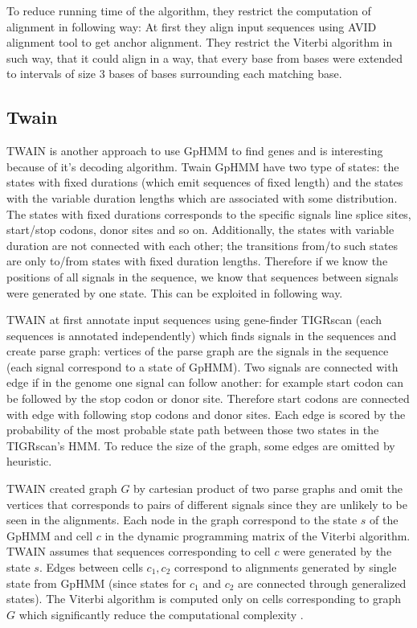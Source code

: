 To reduce running time of the algorithm, they restrict the computation of
alignment in following way: At first they  align input sequences using AVID
alignment tool\cite{Bray2003} to get anchor alignment. They restrict the Viterbi
algorithm in such way, that it could align  in a way, that every base from
bases were extended to intervals of size $3$ bases of bases surrounding each
matching base.



\subsection{Twain}

TWAIN is another approach to use GpHMM to find genes \cite{Majoros2005} and is
interesting because of it's decoding algorithm. Twain GpHMM have two type of
states: the states with fixed durations (which emit sequences of fixed length)
and the states with the variable duration lengths which are associated with some
distribution.  The states with fixed durations corresponds to the specific
signals line splice sites, start/stop codons, donor sites and so on.
Additionally, the states with variable duration are not connected with each
other; the transitions from/to such states are only to/from states with fixed
duration lengths. Therefore if we know the positions of all signals in the
sequence, we know that sequences between signals were generated by one state.
This can be exploited in following way.

TWAIN at first annotate input sequences using gene-finder TIGRscan
\cite{Majoros2004} (each sequences is annotated independently) which finds
signals in the sequences and create parse graph: vertices of the parse graph are
the signals in the sequence (each signal correspond to a state of GpHMM).  Two
signals are connected with edge if in the genome one signal can follow another:
for example start codon can be followed by the stop codon or donor site.
Therefore start codons are connected with edge with following stop codons and
donor sites. Each edge is scored by the probability of the most probable state
path between those two states in the TIGRscan's HMM. To reduce the size of the
graph, some edges are omitted by heuristic.

TWAIN created graph $G$ by cartesian product of two parse graphs and omit the
vertices that corresponds to pairs of different signals since they are unlikely
to be seen in the alignments. Each node in the graph correspond to the state $s$
of the GpHMM and cell $c$ in the dynamic programming matrix of the Viterbi
algorithm. TWAIN assumes that sequences corresponding to cell $c$ were generated
by the state $s$.  Edges between cells $c_1,c_2$ correspond to alignments
generated by single state from GpHMM (since states for $c_1$ and $c_2$ are
connected through generalized states).  The Viterbi algorithm is computed only
on cells corresponding to graph $G$ which significantly reduce the computational
complexity \cite{Majoros2005}.

